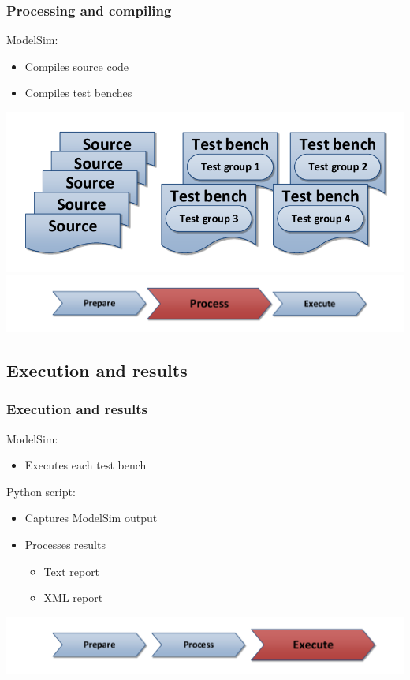 \documentclass[british,10pt]{beamer}
\begin{document}
\begin{frame}\frametitle{Processing and compiling}
\vskip45pt
ModelSim:
\begin{itemize}
\item Compiles source code
\item Compiles test benches
\end{itemize}
\centering
\includegraphics[width=.75\textwidth]{images/sources.pdf}
\vskip15pt
\includegraphics[width=.7\textwidth]{images/ppe2.pdf}
\end{frame}


\subsection{Execution and results}
\begin{frame}\frametitle{Execution and results}
\vskip48pt
ModelSim:
\begin{itemize}
\item Executes each test bench
\end{itemize}
\vskip5pt
Python script:
\begin{itemize}
\item Captures ModelSim output
\item Processes results
\begin{itemize}
\item Text report
\item XML report
\end{itemize}
\end{itemize}
\centering
\vskip48pt
\includegraphics[width=.7\textwidth]{images/ppe3.pdf}
\end{frame}
\end{document}
